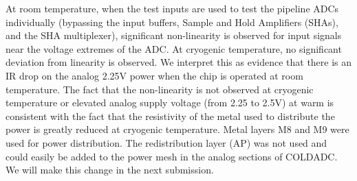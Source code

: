 \label{sec:5.6}

%
%

At room temperature, when the test inputs are used to test the pipeline ADCs individually (bypassing the input buffers, Sample and Hold Amplifiers (SHAs), and the SHA multiplexer), significant non-linearity is observed for input signals near the voltage extremes of the ADC.  At cryogenic temperature, no significant deviation from linearity is observed.  We interpret this as evidence that there is an IR drop on the analog 2.25V power when the chip is operated at room temperature.  The fact that the non-linearity is not observed at cryogenic temperature or elevated analog supply voltage (from 2.25 to 2.5V) at warm is consistent with the fact that the resistivity of the metal used to distribute the power is greatly reduced at cryogenic temperature. 
Metal layers M8 and M9 were used for power distribution.  The redistribution layer (AP) was not used and could easily be added to the power mesh in the analog sections of COLDADC.  We will make this change in the next submission.
